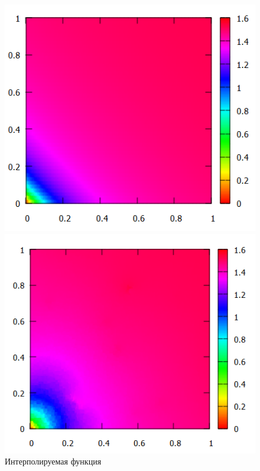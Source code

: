 \documentclass[14pt, a4paper]{extarticle}
\begin{document}
\begin{enumerate}
			\begin{figure}[H]
				\begin{minipage}{0.5\textwidth}
					\centering
					\includegraphics[width = \linewidth]{../2func/orig.png}
					\caption[.] {Интерполируемая функция}
				\end{minipage}\hfill
				\begin{minipage}{0.5\textwidth}
					\centering
					\includegraphics[width = \linewidth]{../2func/M=10T=5774Err=0.022348.png}

\end{minipage}
\end{figure}
\end{enumerate}
\end{document}
